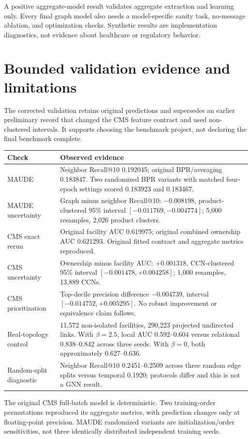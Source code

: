\documentclass[11pt,a4paper]{article}
\begin{document}
A positive aggregate-model result validates aggregate extraction and learning only. Every final graph model also needs a model-specific sanity task, no-message ablation, and optimization checks. Synthetic results are implementation diagnostics, not evidence about healthcare or regulatory behavior.

\section{Bounded validation evidence and limitations}
The corrected validation retains original predictions and supersedes an earlier preliminary record that changed the CMS feature contract and used non-clustered intervals. It supports choosing the benchmark project, not declaring the final benchmark complete.
\begin{center}
\begin{tabularx}{\linewidth}{@{}lY@{}}
\toprule
Check & Observed evidence\\ \midrule
MAUDE & Neighbor Recall@10 0.192045; original BPR/averaging 0.183847. Two randomized BPR variants with matched four-epoch settings scored 0.183923 and 0.183467.\\
MAUDE uncertainty & Graph minus neighbor Recall@10: $-0.008198$, product-clustered 95\% interval $[-0.011769,-0.004774]$; 5,000 resamples, 2,026 product clusters.\\
CMS exact rerun & Original facility AUC 0.619975; original combined ownership AUC 0.621293. Original fitted contract and aggregate metrics reproduced.\\
CMS uncertainty & Ownership minus facility AUC: $+0.001318$, CCN-clustered 95\% interval $[-0.001478,+0.004258]$; 1,000 resamples, 13,889 CCNs.\\
CMS prioritization & Top-decile precision difference $-0.004739$, interval $[-0.014752,+0.005295]$. No robust improvement or equivalence claim follows.\\
Real-topology control & 11,572 non-isolated facilities, 290,223 projected undirected links. With $\beta=2.5$, local AUC 0.592--0.604 versus relational 0.838--0.842 across three seeds. With $\beta=0$, both approximately 0.627--0.636.\\
Random-split diagnostic & Neighbor Recall@10 0.2451--0.2509 across three random edge splits versus temporal 0.1920; protocols differ and this is not a GNN result.\\
\bottomrule
\end{tabularx}
\end{center}
The original CMS full-batch model is deterministic. Two training-order permutations reproduced its aggregate metrics, with prediction changes only at floating-point precision. MAUDE randomized variants are initialization/order sensitivities, not three identically distributed independent training seeds.
\end{document}

